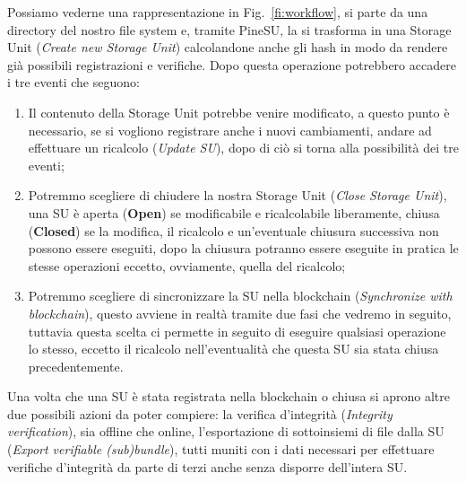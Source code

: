 Possiamo vederne una rappresentazione in Fig.~\ref{fi:workflow}, si parte da una directory del nostro file
system e, tramite PineSU, la si trasforma in una Storage Unit (\emph{Create new Storage Unit}) calcolandone
anche gli hash in modo da rendere già possibili registrazioni e verifiche.
Dopo questa operazione potrebbero accadere i tre eventi che seguono: 
\begin{enumerate}
    \item Il contenuto della Storage Unit potrebbe venire modificato,
    a questo punto è necessario, se si vogliono registrare anche i nuovi cambiamenti,
    andare ad effettuare un ricalcolo (\emph{Update SU}), dopo di ciò
    si torna alla possibilità dei tre eventi;
    \item Potremmo scegliere di chiudere la nostra Storage Unit (\emph{Close Storage Unit}),
    una SU è aperta (\textbf{Open}) se modificabile e ricalcolabile liberamente,
    chiusa (\textbf{Closed}) se la modifica, il ricalcolo e un’eventuale chiusura
    successiva non possono essere eseguiti, dopo la chiusura potranno essere eseguite
    in pratica le stesse operazioni eccetto, ovviamente, quella del ricalcolo;
    \item Potremmo scegliere di sincronizzare la SU nella blockchain (\emph{Synchronize with blockchain}),
    questo avviene in realtà tramite due fasi che vedremo in seguito, tuttavia
    questa scelta ci permette in seguito di eseguire qualsiasi operazione lo stesso,
    eccetto il ricalcolo nell’eventualità che questa SU sia stata chiusa precedentemente.
\end{enumerate}

Una volta che una SU è stata registrata nella blockchain o chiusa si aprono altre
due possibili azioni da poter compiere: la verifica d’integrità (\emph{Integrity verification}),
sia offline che online, l’esportazione di sottoinsiemi di file dalla SU (\emph{Export verifiable (sub)bundle}),
tutti muniti con i dati necessari per effettuare verifiche d’integrità da parte di terzi
anche senza disporre dell’intera SU.

